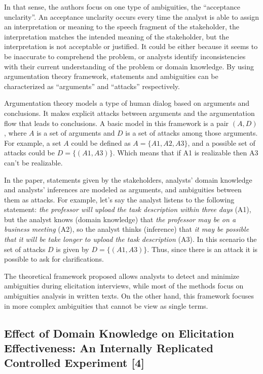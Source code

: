 \documentclass[]{llncs}
\begin{document}
In that sense, the authors focus on one type of ambiguities, the
``acceptance unclarity''. An acceptance unclarity occurs every time the
analyst is able to assign an interpretation or meaning to the speech
fragment of the stakeholder, the interpretation matches the intended
meaning of the stakeholder, but the interpretation is not acceptable or
justified. It could be either because it seems to be inaccurate to
comprehend the problem, or analysts identify inconsistencies with their
current understanding of the problem or domain knowledge. By using
argumentation theory framework, statements and ambiguities can be
characterized as ``arguments'' and ``attacks'' respectively.

Argumentation theory models a type of human dialog based on arguments
and conclusions. It makes explicit attacks between arguments and the
argumentation flow that leads to conclusions. A basic model in this
framework is a pair \((A,D)\), where \(A\) is a set of arguments and
\(D\) is a set of attacks among those arguments. For example, a set
\(A\) could be defined as \(A = \{A1,A2,A3\}\), and a possible set of
attacks could be \(D = \{(A1,A3)\}\). Which means that if A1 is
realizable then A3 can't be realizable.

In the paper, statements given by the stakeholders, analysts' domain
knowledge and analysts' inferences are modeled as arguments, and
ambiguities between them as attacks. For example, let's say the analyst
listens to the following statement: \emph{the professor will upload the
task description within three days} (A1), but the analyst knows (domain
knowledge) that \emph{the professor may be on a business meeting} (A2),
so the analyst thinks (inference) that \emph{it may be possible that it
will be take longer to upload the task description} (A3). In this
scenario the set of attacks \(D\) is given by \(D = \{(A1,A3)\}\). Thus,
since there is an attack it is possible to ask for clarifications.

The theoretical framework proposed allows analysts to detect and
minimize ambiguities during elicitation interviews, while most of the
methods focus on ambiguities analysis in written texts. On the other
hand, this framework focuses in more complex ambiguities that cannot be
view as single terms.

\hypertarget{effect-of-domain-knowledge-on-elicitation-effectiveness-an-internally-replicated-controlled-experiment-aranda2016effect}{%
\subsection{Effect of Domain Knowledge on Elicitation Effectiveness: An
Internally Replicated Controlled Experiment
{[}4{]}}\label{effect-of-domain-knowledge-on-elicitation-effectiveness-an-internally-replicated-controlled-experiment-aranda2016effect}}
\end{document}
